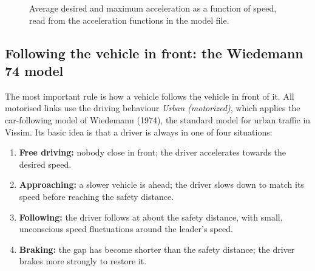 \documentclass[11pt,a4paper]{article}
\begin{document}
\begin{figure}[!htb]
\centering
{}
\caption[Acceleration functions]{Average desired and maximum acceleration as a function of speed,
read from the acceleration functions in the model file.}
\label{fig:accel}
\end{figure}

\subsection{Following the vehicle in front: the Wiedemann 74 model}
\label{sec:w74}

The most important rule is how a vehicle follows the vehicle in front of it. All motorised links
use the driving behaviour \emph{Urban (motorized)}, which applies the car-following model of
Wiedemann (1974), the standard model for urban traffic in Vissim. Its basic idea is that a driver
is always in one of four situations:
\begin{enumerate}
  \item \textbf{Free driving:} nobody close in front; the driver accelerates towards the desired
        speed.
  \item \textbf{Approaching:} a slower vehicle is ahead; the driver slows down to match its speed
        before reaching the safety distance.
  \item \textbf{Following:} the driver follows at about the safety distance, with small,
        unconscious speed fluctuations around the leader's speed.
  \item \textbf{Braking:} the gap has become shorter than the safety distance; the driver brakes
        more strongly to restore it.
\end{enumerate}
\end{document}
